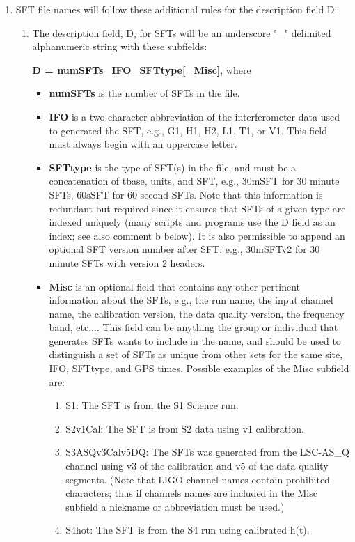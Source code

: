 \documentclass{ligodcc}
\begin{document}
\begin{enumerate}
\item SFT file names will follow these additional rules for the description
field D:

\begin{enumerate}
\item The description field, D, for SFTs will be an underscore "\_"
delimited alphanumeric string with these subfields:

{\bf D = numSFTs\_IFO\_SFTtype[\_Misc]}, where
\begin{itemize}
\item {\bf numSFTs} is the number of SFTs in the file.

\item {\bf IFO} is a two character abbreviation of the interferometer data used to
generated the SFT, e.g., G1, H1, H2, L1, T1, or V1.  This field must
always begin with an uppercase letter.

\item {\bf SFTtype} is the type of SFT(s) in the file, and must be a concatenation
of tbase, units, and SFT, e.g., 30mSFT for 30 minute SFTs, 60sSFT for 60
second SFTs.  Note that this information is redundant but required since
it ensures that SFTs of a given type are indexed uniquely (many scripts
and programs use the D field as an index; see also comment b below). It
is also permissible to append an optional SFT version number after SFT:
e.g., 30mSFTv2 for 30 minute SFTs with version 2 headers.

\item {\bf Misc} is an optional field that contains any other pertinent information
about the SFTs, e.g., the run name, the input channel name, the
calibration version, the data quality version, the frequency band,
etc.... This field can be anything the group or individual that
generates SFTs wants to include in the name, and should be used to
distinguish a set of SFTs as unique from other sets for the same site,
IFO, SFTtype, and GPS times. Possible examples of the Misc subfield are:
\begin{enumerate}
\item S1: The SFT is from the S1 Science run.
\item S2v1Cal: The SFT is from S2 data using v1 calibration.
\item  S3ASQv3Calv5DQ: The SFTs was generated from the LSC-AS\_Q channel
  using v3 of the calibration and v5 of the data quality segments.  (Note
  that LIGO channel names contain prohibited characters; thus if channels
  names are included in the Misc subfield a nickname or abbreviation must
  be used.)
\item S4hot: The SFT is from the S4 run using calibrated h(t).
\end{enumerate}
\end{itemize}


\end{enumerate}
\end{enumerate}
\end{document}
